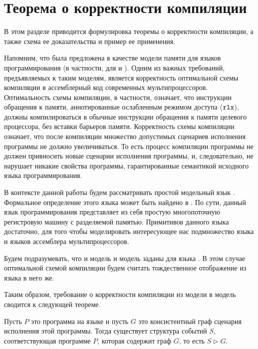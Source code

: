\pagebreak

\section{Теорема о корректности компиляции}

В этом разделе приводится формулировка теоремы о
корректности компиляции, а также схема ее доказательства
и пример ее применения.

Напомним, что \Wkm была предложена в качестве модели памяти
для языков программирования (в частности, для \CPP и \LLVMIR).
Одним из важных требований, предъявляемых к таким моделям,
является корректность оптимальной схемы компиляции
в ассемблерный код современных мультипроцессоров.
Оптимальность схемы компиляции, в частности,
означает, что инструкции обращения к памяти,
аннотированные ослабленным режимом доступа ($\mathtt{rlx}$),
должны компилироваться в обычные инструкции обращения к
памяти целевого процессора, без вставки барьеров памяти.
Корректность схемы компиляции означает, что после
компиляции множество допустимых сценариев исполнения программы
не должно увеличиваться. То есть процесс компиляции программы
не должен привносить новые сценарии исполнения программы,
и, следовательно, не нарушает никакие свойства программы,
гарантированные семантикой исходного языка программирования.

В контексте данной работы будем рассматривать
простой модельный язык \LLANG.
Формальное определение этого языка может быть
найдено в \cite[Рис.2]{Podkopaev-al:POPL19}.
По сути, данный язык программирования представляет
из себя простую многопоточную регистровую машину
с разделяемой памятью.
Примитивов данного языка достаточно,
для того чтобы моделировать интересующее
нас подмножество языка \CPP и языков ассемблера мультипроцессоров.

Будем подразумевать, что и модель \Wkm
и модель \IMM заданы для языка \LLANG.
В этом случае оптимальной схемой компиляции будем считать
тождественное отображение из языка \LLANG в него же.

Таким образом, требование о корректности компиляции
из модели \Wkm в модель \IMM сводится к следующей теореме. 

\begin{theorem}
  \label{thm:main}
  Пусть $P$ это программа на языке \LLANG
  и пусть $G$ это \IMM консистентный граф сценария исполнения этой программы.
  Тогда существует структура событий $S$, соответствующая программе $P$,
  которая содержит граф $G$, то есть $S \rhd G$.
\end{theorem}

